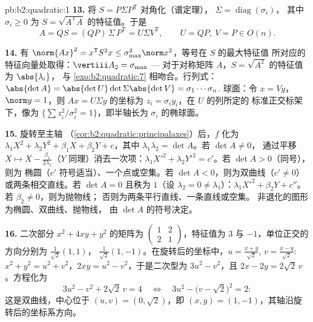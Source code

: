 \begin{solution}{pb:b2:quadratic:1}
\textbf{13.} 将 $S = P\Sigma P^{\mathsf T}$ 对角化（谱定理），
$\Sigma = \operatorname{diag}(\sigma_i)$，
其中 $\sigma_i \geq 0$ 为 $S =
\sqrt{A^{\mathsf T}A}$ 的特征值。于是
\[
A = QS = (QP)\,\Sigma\,P^{\mathsf T} = U\Sigma V^{\mathsf T},
\qquad U = QP,\ V = P \in O(n) .
\]

\textbf{14.} 有 $\norm{Ax}^2 = x^{\mathsf T}S^2x \leq
\sigma_{\max}^2\norm x^2$，等号在 $S$ 的最大特征值
所对应的特征向量处取得：$\vertiii A_2 = \sigma_{\max}$ ---
对于对称矩阵 $A$，$S = \sqrt{A^2}$ 的特征值为 $\abs{\lambda_i}$，
与 \cref{exo:b2:quadratic:7} 相吻合。行列式：$\abs{\det A} =
\abs{\det U}\det\Sigma\abs{\det V} = \sigma_1\cdots\sigma_n$.
球面：令 $x = Vy$，$\norm y = 1$，则 $Ax = U\Sigma y$
的坐标为 $z_i = \sigma_iy_i$，在 $U$ 的列所定的
标准正交标架下，像为 $\{\sum z_i^2/\sigma_i^2 =
1\}$，即半轴长为 $\sigma_i$ 的椭球面。

\textbf{15.} 旋转至主轴
（\cref{cor:b2:quadratic:principalaxes}）后，$f$ 化为
$\lambda_1X^2 + \lambda_2Y^2 + \beta_1X + \beta_2Y + c$，其中
$\lambda_1\lambda_2 = \det A$。若 $\det A \neq 0$，
通过平移 $X \mapsto X -
\frac{\beta_1}{2\lambda_1}$（$Y$ 同理）消去一次项：$\lambda_1X'^2
+ \lambda_2Y'^2 = c'$。若 $\det A > 0$（同号），则为
椭圆（$c'$ 符号适当）、一个点或空集。若 $\det
A < 0$，则为双曲线（$c' \neq 0$）或两条相交直线。若
$\det A = 0$ 且秩为 $1$（设 $\lambda_2 = 0 \neq
\lambda_1$）：$\lambda_1X'^2 + \beta_2Y + c''$。若 $\beta_2 \neq 0$，则为抛物线；
否则为两条平行直线、一条直线或空集。
非退化的图形为椭圆、双曲线、抛物线，
由 $\det A$ 的符号决定。

\textbf{16.} 二次部分 $x^2 + 4xy + y^2$ 的矩阵为
$\begin{pmatrix}1 & 2\\ 2 & 1\end{pmatrix}$，特征值为 $3$
与 $-1$，单位正交的方向分别为 $\frac{1}{\sqrt2}(1,1)$，
$\frac{1}{\sqrt2}(1,-1)$。在旋转后的坐标中，$u =
\frac{x+y}{\sqrt2}$, $v = \frac{x-y}{\sqrt2}$: $x^2 + y^2 = u^2
+ v^2$，$2xy = u^2 - v^2$，于是二次型为 $3u^2 - v^2$，且 $2x
- 2y = 2\sqrt2\,v$。方程化为
\[
3u^2 - v^2 + 2\sqrt2\,v = 4
\quad\Longleftrightarrow\quad
3u^2 - \bigl(v - \sqrt2\bigr)^2 = 2 :
\]
这是双曲线，中心位于 $(u, v) = (0, \sqrt2)$，即 $(x, y) =
(1, -1)$，其轴沿旋转后的坐标系方向。


\end{solution}
